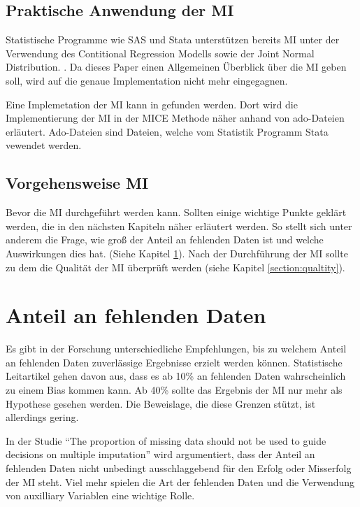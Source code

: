 \subsection{Praktische Anwendung der MI}

Statistische Programme wie SAS und Stata unterstützen bereits MI unter der Verwendung des Contitional Regression Modells 
sowie der Joint Normal Distribution. \autocite[164]{Lee2014}. Da dieses Paper einen Allgemeinen Überblick über die MI 
geben soll, wird auf die genaue Implementation nicht mehr eingegagnen. 

Eine Implemetation der MI kann in \textcite[]{Royston2005} gefunden werden. Dort wird die Implementierung der MI in der MICE Methode 
näher anhand von ado-Dateien erläutert. Ado-Dateien sind Dateien, welche vom Statistik Programm Stata vewendet werden.

\subsection{Vorgehensweise MI}

Bevor die MI durchgeführt werden kann. Sollten einige wichtige Punkte geklärt werden, die in den nächsten 
Kapiteln näher erläutert werden. So stellt sich unter anderem die Frage, wie groß der Anteil an fehlenden 
Daten ist und welche Auswirkungen dies hat. (Siehe Kapitel \ref{section:missing_data}). Nach der 
Durchführung der MI sollte zu dem die Qualität der MI überprüft werden (siehe Kapitel \ref{section:qualtity}).


\section{Anteil an fehlenden Daten}
\label{section:missing_data}

Es gibt in der Forschung unterschiedliche Empfehlungen, bis zu welchem Anteil an fehlenden 
Daten zuverlässige Ergebnisse erzielt werden können. Statistische Leitartikel gehen davon aus, 
dass es ab 10\% an fehlenden Daten wahrscheinlich zu einem Bias kommen kann. Ab 40\% sollte 
das Ergebnis der MI nur mehr als Hypothese gesehen werden. Die Beweislage, die diese Grenzen 
stützt, ist allerdings gering. \autocite[63 f.]{Madley-Dowd2019}

In der Studie “The proportion of missing data should not be used to guide decisions on multiple imputation” wird 
argumentiert, dass der Anteil an fehlenden Daten nicht unbedingt ausschlaggebend für den Erfolg oder Misserfolg der 
MI steht. Viel mehr spielen die Art der fehlenden Daten und die Verwendung von auxilliary Variablen eine wichtige Rolle. 


